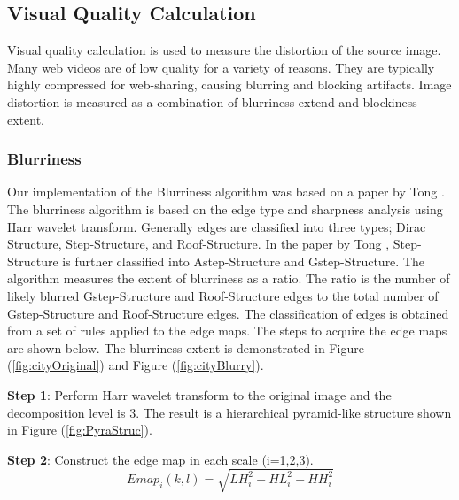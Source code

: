 \subsection{Visual Quality Calculation} \label{sec:BlurBlockSec}

Visual quality calculation is used to measure the distortion of the source image.  
Many web videos are of low quality for a variety of reasons.  
They are typically highly compressed for web-sharing, causing blurring and blocking artifacts.  
Image distortion is measured as a combination of blurriness extend and blockiness extent.

\subsubsection{Blurriness}

Our implementation of the Blurriness algorithm was based on a paper by Tong \cite{Tong}.  
The blurriness algorithm is based on the edge type and sharpness analysis using Harr wavelet transform.  
Generally edges are classified into three types; Dirac Structure, Step-Structure, and Roof-Structure.  
In the paper by Tong \cite{Tong}, Step-Structure is further classified into Astep-Structure and Gstep-Structure.   
The algorithm measures the extent of blurriness as a ratio.  The ratio is the number of likely blurred 
Gstep-Structure and Roof-Structure edges to the total number of Gstep-Structure and Roof-Structure edges.  
The classification of edges is obtained from a set of rules applied to the edge maps.  
The steps to acquire the edge maps are shown below.  
The blurriness extent is demonstrated in Figure (\ref{fig:cityOriginal}) and Figure (\ref{fig:cityBlurry}).

\vspace{5 mm}

\noindent\textbf{Step 1}: Perform Harr wavelet transform to the original image and the decomposition level is 3.  
The result is a hierarchical pyramid-like structure shown in Figure (\ref{fig:PyraStruc}).

\vspace{5 mm}

\noindent\textbf{Step 2}: Construct the edge map in each scale (i=1,2,3).
\begin{equation}
Emap_{i}(k,l)=\sqrt{LH_{i}^{2}+HL_{i}^{2}+HH_{i}^{2}}  
\end{equation}

\vspace{5 mm}

